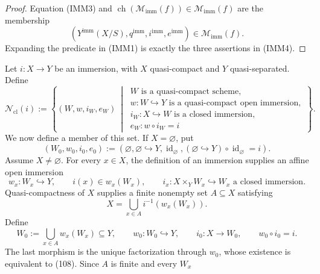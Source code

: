 \begin{proof}
  Equation (IMM3) and
  \(\operatorname{ch}(\mathscr M_{\mathrm{imm}}(f))
    \in\mathscr M_{\mathrm{imm}}(f)\)
  are the membership
  \[
    (Y^{\mathrm{imm}}(X/S),q^{\mathrm{imm}},
      i^{\mathrm{imm}},e^{\mathrm{imm}})
      \in\mathscr M_{\mathrm{imm}}(f).
  \]
  Expanding the predicate in (IMM1) is exactly the three assertions in (IMM4).
\end{proof}
\begin{definition}
  \label{def:nagata-immersion-shrink-to-closed}

  Let \(i\colon X\to Y\) be an immersion, with \(X\) quasi-compact and
  \(Y\) quasi-separated.  Define
  \[
    \mathscr N_{\mathrm{cl}}(i):=
      \left\{(W,w,i_W,e_W)\ \middle|\
      \begin{array}{l}
        W\text{ is a quasi-compact scheme},\\
        w\colon W\hookrightarrow Y\text{ is a quasi-compact open immersion},\\
        i_W\colon X\hookrightarrow W\text{ is a closed immersion},\\
        e_W\colon w\circ i_W=i
      \end{array}\right\}.                                        \tag{105}
  \]
  We now define a member of this set.  If \(X=\varnothing\), put
  \[
    (W_0,w_0,i_0,e_0):=
      (\varnothing,\varnothing\hookrightarrow Y,
        \operatorname{id}_{\varnothing},
        (\varnothing\hookrightarrow Y)\circ
          \operatorname{id}_{\varnothing}=i).                     \tag{106}
  \]
  Assume \(X\neq\varnothing\).  For every \(x\in X\), the definition of an
  immersion supplies an affine open immersion
  \[
    w_x\colon W_x\hookrightarrow Y,\qquad i(x)\in w_x(W_x),
    \qquad
    i_x\colon X\times_YW_x\hookrightarrow W_x
      \text{ a closed immersion}.                                 \tag{107}
  \]
  Quasi-compactness of \(X\) supplies a finite nonempty set \(A\subseteq X\)
  satisfying
  \[
    X=\bigcup_{x\in A}i^{-1}(w_x(W_x)).                            \tag{108}
  \]
  Define
  \[
    W_0:=\bigcup_{x\in A}w_x(W_x)\subseteq Y,\qquad
    w_0\colon W_0\hookrightarrow Y,\qquad
    i_0\colon X\to W_0,\qquad
    w_0\circ i_0=i.                                                \tag{109}
  \]
  The last morphism is the unique factorization through \(w_0\), whose
  existence is equivalent to (108).  Since \(A\) is finite and every \(W_x\)

\end{definition}
